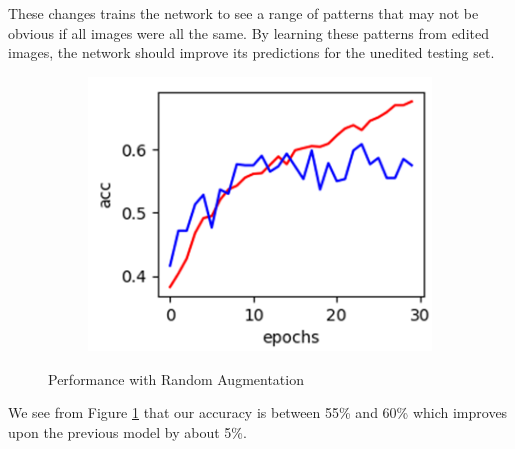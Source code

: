 \documentclass[../main.tex]{subfiles}
\begin{document}
These changes trains the network to see a range of patterns that may not be obvious if all images were all the same. By learning these patterns from edited images, the network should improve its predictions for the unedited testing set. 

\begin{figure}[h!]
  \centering
  \begin{subfigure}[b]{0.35\linewidth}
    \includegraphics[width=\linewidth]{pre-processing-performance.png}
  \end{subfigure}
  \caption{Performance with Random Augmentation}
  \label{fig:preprocessing-performance}
\end{figure}

We see from Figure \ref{fig:preprocessing-performance} that our accuracy is between 55\% and 60\% which improves upon the previous model by about 5\%. 
\end{document}
